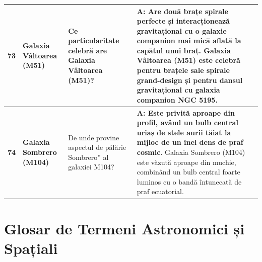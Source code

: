 \begin{longtable}{@{}r >{\raggedright\arraybackslash}p{2.7cm} >{\raggedright\arraybackslash}p{4.8cm} >{\raggedright\arraybackslash}p{6.5cm}@{}}
\textbf{73} & \textbf{Galaxia Vâltoarea (M51)} & Ce particularitate celebră are Galaxia Vâltoarea (M51)? & \textbf{A: Are două brațe spirale perfecte și interacționează gravitațional cu o galaxie companion mai mică aflată la capătul unui braț}. {\footnotesize Galaxia Vâltoarea (M51) este celebră pentru brațele sale spirale grand-design și pentru dansul gravitațional cu galaxia companion NGC 5195.} \\ \midrule
\textbf{74} & \textbf{Galaxia Sombrero (M104)} & De unde provine aspectul de \quotedblbase{}pălărie Sombrero\textquotedblright{} al galaxiei M104? & \textbf{A: Este privită aproape din profil, având un bulb central uriaș de stele aurii tăiat la mijloc de un inel dens de praf cosmic}. {\footnotesize Galaxia Sombrero (M104) este văzută aproape din muchie, combinând un bulb central foarte luminos cu o bandă întunecată de praf ecuatorial.} \\ \midrule
\end{longtable}
\endgroup

\clearpage
\section{Glosar de Termeni Astronomici și Spațiali}

